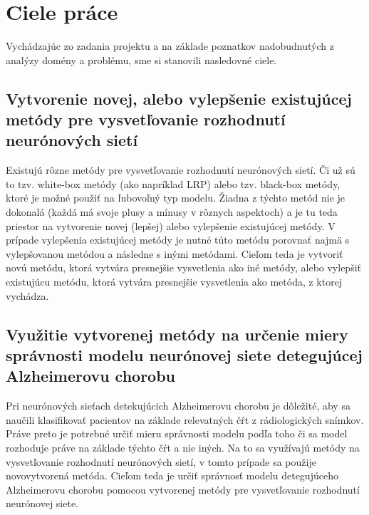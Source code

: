 \chapter{Ciele práce \label{sec:goals}}

Vychádzajúc zo zadania projektu a na základe poznatkov nadobudnutých z analýzy domény a problému, sme si stanovili nasledovné ciele.

\section{Vytvorenie novej, alebo vylepšenie existujúcej metódy pre vysvetľovanie rozhodnutí neurónových sietí \label{sec:goals_1}} 

Existujú rôzne metódy pre vysvetľovanie rozhodnutí neurónových sietí. Či už sú to tzv. white-box metódy (ako napríklad LRP) alebo tzv. black-box metódy, ktoré je možné použiť na ľubovoľný typ modelu. Žiadna z týchto metód nie je dokonalá (každá má svoje plusy a mínusy v rôznych aspektoch) a je tu teda priestor na vytvorenie novej (lepšej) alebo vylepšenie existujúcej metódy. V prípade vylepšenia existujúcej metódy je nutné túto metódu porovnať najmä s vylepšovanou metódou a následne s inými metódami. Cieľom teda je vytvoriť novú metódu, ktorá vytvára presnejšie vysvetlenia ako iné metódy, alebo vylepšiť existujúcu metódu, ktorá vytvára presnejšie vysvetlenia ako metóda, z ktorej vychádza.

\section{Využitie vytvorenej metódy na určenie miery správnosti modelu neurónovej siete detegujúcej Alzheimerovu chorobu \label{sec:goals_2}}

Pri neurónových sieťach detekujúcich Alzheimerovu chorobu je dôležité, aby sa naučili klasifikovať pacientov na základe relevatných čŕt z rádiologických snímkov. Práve preto je potrebné určiť mieru správnosti modelu podľa toho či sa model rozhoduje práve na základe týchto čŕt a nie iných. Na to sa využívajú metódy na vysvetľovanie rozhodnutí neurónových sietí, v tomto prípade sa použije novovytvorená metóda. Cieľom teda je určiť správnosť modelu detegujúceho Alzheimerovu chorobu pomocou vytvorenej metódy pre vysvetľovanie rozhodnutí neurónovej siete.

